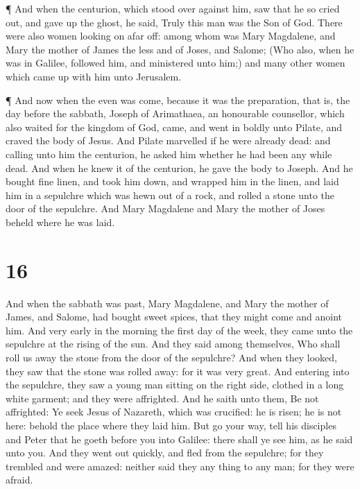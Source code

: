  ¶ And when the centurion, which stood over against him,
saw that he so cried out, and gave up the ghost, he said, Truly this man
was the Son of God.  There were also women looking on afar
off: among whom was Mary Magdalene, and Mary the mother of James the
less and of Joses, and Salome;  (Who also, when he was in
Galilee, followed him, and ministered unto him;) and many other women
which came up with him unto Jerusalem.

 ¶ And now when the even was come, because it was the
preparation, that is, the day before the sabbath,  Joseph
of Arimathaea, an honourable counsellor, which also waited for the
kingdom of God, came, and went in boldly unto Pilate, and craved the
body of Jesus.  And Pilate marvelled if he were already
dead: and calling unto him the centurion, he asked him whether he had
been any while dead.  And when he knew it of the centurion,
he gave the body to Joseph.  And he bought fine linen, and
took him down, and wrapped him in the linen, and laid him in a sepulchre
which was hewn out of a rock, and rolled a stone unto the door of the
sepulchre.  And Mary Magdalene and Mary the mother of Joses
beheld where he was laid.

\hypertarget{section-15}{%
\section{16}\label{section-15}}

 And when the sabbath was past, Mary Magdalene, and Mary the
mother of James, and Salome, had bought sweet spices, that they might
come and anoint him.  And very early in the morning the
first day of the week, they came unto the sepulchre at the rising of the
sun.  And they said among themselves, Who shall roll us away
the stone from the door of the sepulchre?  And when they
looked, they saw that the stone was rolled away: for it was very great.
 And entering into the sepulchre, they saw a young man
sitting on the right side, clothed in a long white garment; and they
were affrighted.  And he saith unto them, Be not affrighted:
Ye seek Jesus of Nazareth, which was crucified: he is risen; he is not
here: behold the place where they laid him.  But go your
way, tell his disciples and Peter that he goeth before you into Galilee:
there shall ye see him, as he said unto you.  And they went
out quickly, and fled from the sepulchre; for they trembled and were
amazed: neither said they any thing to any man; for they were afraid.

